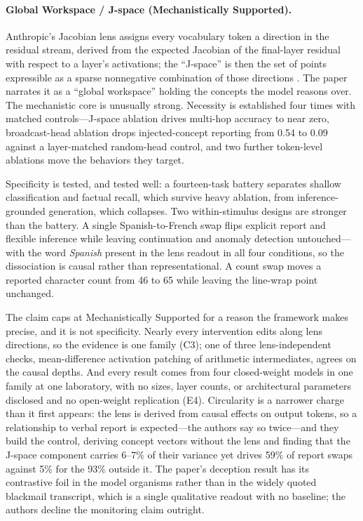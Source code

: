 \documentclass{article}
\begin{document}
\paragraph{Global Workspace / J-space (Mechanistically Supported).} Anthropic's Jacobian lens assigns every vocabulary token a direction in the residual stream, derived from the expected Jacobian of the final-layer residual with respect to a layer's activations; the ``J-space'' is then the set of points expressible as a sparse nonnegative combination of those directions \citep{gurnee2026verbalizable}. The paper narrates it as a ``global workspace'' holding the concepts the model reasons over. The mechanistic core is unusually strong. Necessity is established four times with matched controls---J-space ablation drives multi-hop accuracy to near zero, broadcast-head ablation drops injected-concept reporting from 0.54 to 0.09 against a layer-matched random-head control, and two further token-level ablations move the behaviors they target.

Specificity is tested, and tested well: a fourteen-task battery separates shallow classification and factual recall, which survive heavy ablation, from inference-grounded generation, which collapses. Two within-stimulus designs are stronger than the battery. A single Spanish-to-French swap flips explicit report and flexible inference while leaving continuation and anomaly detection untouched---with the word \emph{Spanish} present in the lens readout in all four conditions, so the dissociation is causal rather than representational. A count swap moves a reported character count from 46 to 65 while leaving the line-wrap point unchanged.

The claim caps at Mechanistically Supported for a reason the framework makes precise, and it is not specificity. Nearly every intervention edits along lens directions, so the evidence is one family (C3); one of three lens-independent checks, mean-difference activation patching of arithmetic intermediates, agrees on the causal depths. And every result comes from four closed-weight models in one family at one laboratory, with no sizes, layer counts, or architectural parameters disclosed and no open-weight replication (E4). Circularity is a narrower charge than it first appears: the lens is derived from causal effects on output tokens, so a relationship to verbal report is expected---the authors say so twice---and they build the control, deriving concept vectors without the lens and finding that the J-space component carries 6--7\% of their variance yet drives 59\% of report swaps against 5\% for the 93\% outside it. The paper's deception result has its contrastive foil in the model organisms rather than in the widely quoted blackmail transcript, which is a single qualitative readout with no baseline; the authors decline the monitoring claim outright.
\end{document}

